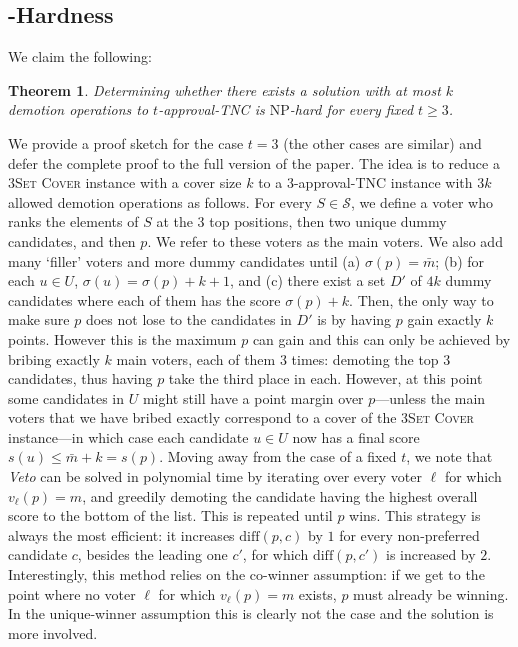 \documentclass[letterpaper]{article} %
\newtheorem{theorem}{Theorem}
\newcommand{\CTSC}{\textsc{3Set Cover}}
\newcommand{\SB}{\textsc{TNC}}
\newcommand{\diff}{\mathrm{diff}}
\newcommand{\NP}{\mathrm{NP}}
\begin{document}
\subsection{\boldmath{$\NP$}-Hardness}
We claim the following:
\begin{theorem}
Determining whether there exists a solution with at most $k$ demotion operations to $t$-approval-\SB{} is $\NP$-hard for every fixed $t \geq 3$.
\end{theorem}
We provide a proof sketch for the case $t=3$ (the other cases are similar) and defer the complete proof to the full version of the paper. The idea is to reduce  a \CTSC{} instance with a cover size $k$ to a $3$-approval-\SB{} instance with  $3k$ allowed demotion operations as follows. For every $S \in \mathcal{S}$, we define a voter who ranks the elements of $S$ at the $3$ top positions, then two unique dummy candidates, and then $p$. We refer to these voters as the main voters. We also add many `filler' voters and more dummy candidates until (a) $\sigma(p)=\bar{m}$; (b) for each $u \in U$,  $\sigma(u) = \sigma(p) + k + 1$, and (c) there exist a set $D'$ of $4k$ dummy candidates where each of them has the score $\sigma(p) + k$. Then, the only way to make sure $p$ does not lose to the candidates in $D'$ is by having $p$ gain exactly $k$ points. However this is the maximum $p$ can gain and this can only be achieved by bribing exactly $k$ main voters, each of them $3$ times: demoting the top $3$ candidates, thus having $p$ take the third place in each. However, at this point some candidates in $U$ might still have a point margin over $p$---unless the main voters that we have bribed exactly correspond to a cover of the \CTSC{} instance---in which case each candidate $u \in U$ now has a final score $s(u) \leq \bar{m} + k = s(p)$.
Moving away from the case of a fixed $t$, we note that \emph{Veto} can be solved in polynomial time by iterating over every voter $\ell$ for which $v_\ell(p)=m$, and greedily demoting the candidate having the highest overall score to the bottom of the list. This is repeated until $p$ wins. This strategy is always the most efficient: it increases $\diff(p,c)$ by $1$ for every non-preferred candidate $c$, besides the leading one $c'$, for which $\diff(p,c')$ is increased by $2$.
Interestingly, this method relies on the co-winner assumption: if we get to the point where no voter  $\ell$ for which $v_\ell(p)=m$ exists, $p$ must already be winning. In the unique-winner assumption this is clearly not the case and the solution is more involved.
\end{document}
